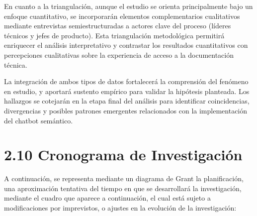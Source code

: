 En cuanto a la triangulación, aunque el estudio se orienta principalmente bajo un enfoque cuantitativo, se incorporarán elementos complementarios cualitativos mediante entrevistas semiestructuradas a actores clave del proceso (líderes técnicos y jefes de producto). Esta triangulación metodológica permitirá enriquecer el análisis interpretativo y contrastar los resultados cuantitativos con percepciones cualitativas sobre la experiencia de acceso a la documentación técnica.

La integración de ambos tipos de datos fortalecerá la comprensión del fenómeno en estudio, y aportará sustento empírico para validar la hipótesis planteada. Los hallazgos se cotejarán en la etapa final del análisis para identificar coincidencias, divergencias y posibles patrones emergentes relacionados con la implementación del chatbot semántico.


\section{2.10 Cronograma de Investigación}

A continuación, se representa mediante un diagrama de Grant la planificación, una
aproximación tentativa del tiempo en que se desarrollará la investigación, mediante el cuadro que
aparece a continuación, el cual está sujeto a modificaciones por imprevistos, o ajustes en la
evolución de la investigación:

